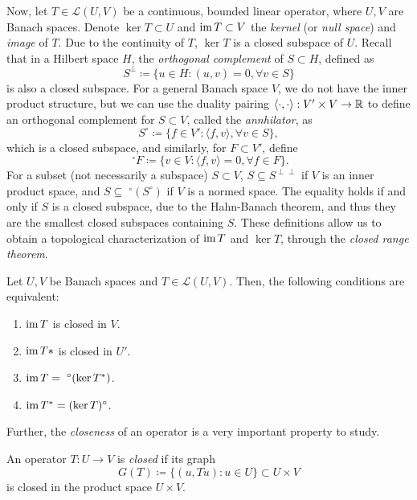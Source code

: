 Now, let $T\in \mathcal{L}(U,V)$ be a continuous, bounded linear operator, where $U,V$ are Banach spaces. Denote $\ker T\subset U$ and $\operatorname{\text{im}} T\subset V$ the \emph{kernel} (or \emph{null space}) and \emph{image} of $T$. Due to the continuity of $T$, $\ker T$ is a closed subspace of $U$. Recall that in a Hilbert space $H$, the \emph{orthogonal complement} of $S\subset H$, defined as
\begin{equation*}
    S^\perp \coloneqq \{u\in H: (u,v)=0,\forall v\in S\}
\end{equation*}
is also a closed subspace. For a general Banach space $V$, we do not have the inner product structure, but we can use the duality pairing $\langle\cdot,\cdot\rangle:V'\times V\to \mathbb{R}$ to define an orthogonal complement for $S\subset V$, called the \emph{annhilator}, as 
\begin{equation*}
    S^\circ \coloneqq \{f\in V': \langle f, v\rangle,\forall v\in S\},
\end{equation*}
which is a closed subspace, and similarly, for $F\subset V'$, define
\begin{equation*}
    \phantom{.}^\circ F \coloneqq \{v\in V:\langle f,v\rangle = 0,\forall f\in F\}.
\end{equation*}
For a subset (not necessarily a subspace) $S\subset V$, $S\subseteq S^{\perp\perp}$ if $V$ is an inner product space, and $S\subseteq\phantom{.}^\circ(S^\circ)$ if $V$ is a normed space. The equality holds if and only if $S$ is a closed subspace, due to the Hahn-Banach theorem, and thus they are the smallest closed subspaces containing $S$. These definitions allow us to obtain a topological characterization of $\operatorname{\text{im}} T$ and $\ker T$, through the \emph{closed range theorem}. 
\begin{theorem}\label{thm:closed-range-theorem}
    Let $U,V$ be Banach spaces and $T\in\mathcal{L}(U,V)$. Then, the following conditions are equivalent: 
    \begin{enumerate}
        \item $\operatorname{\text{im}} T$ is closed in $V$. 
        \item $\operatorname{\text{im}} T*$ is closed in $U'$.
        \item $\operatorname{\text{im}} T = \phantom{.}^\circ (\ker T^*)$.
        \item $\operatorname{\text{im}} T^* = (\ker T)^\circ$.
    \end{enumerate}
\end{theorem}

Further, the \emph{closeness} of an operator is a very important property to study.
\begin{definition}
    An operator $T:U\to V$ is \emph{closed} if its graph 
    \begin{equation}
        G(T) \coloneqq \{(u,Tu):u\in U\}\subset U\times V
    \end{equation}
    is closed in the product space $U\times V$.
\end{definition}

